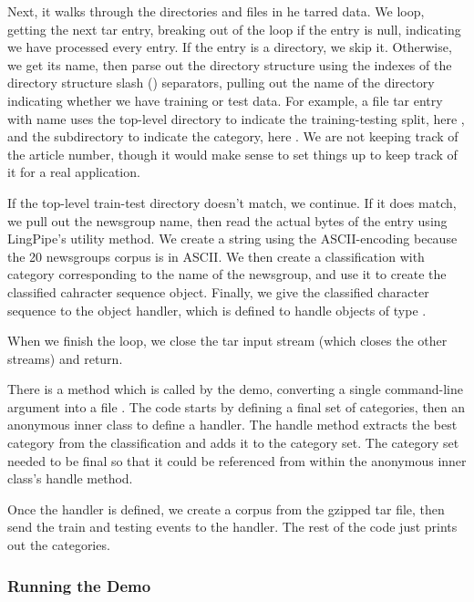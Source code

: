 Next, it walks through the directories and files in he tarred
data.
%
%
We loop, getting the next tar entry, breaking out of the loop if the
entry is null, indicating we have processed every entry.  If the entry
is a directory, we skip it.  Otherwise, we get its name, then parse
out the directory structure using the indexes of the directory
structure slash (\code{/}) separators, pulling out the name of the
directory indicating whether we have training or test data.  For
example, a file tar entry with name
 uses the top-level
directory to indicate the training-testing split, here ,
and the subdirectory to indicate the category, here
.  We are not keeping track of the article number,
though it would make sense to set things up to keep track of it for a
real application.


If the top-level train-test directory doesn't match, we continue.  If
it does match, we pull out the newsgroup name, then read the actual
bytes of the entry using LingPipe's 
utility method.  We create a string using the ASCII-encoding because
the 20 newsgroups corpus is in ASCII.  We then create a classification
with category corresponding to the name of the newsgroup, and use it
to create the classified cahracter sequence object.  Finally, we give
the classified character sequence to the object handler, which is
defined to handle objects of type .

When we finish the loop, we close the tar input stream (which closes
the other streams) and return.

There is a  method which is called by the demo,
converting a single command-line argument into a file
.  The code starts by defining a final set
of categories, then an anonymous inner class to define a handler.
%
%
The handle method extracts the best category from the classification
and adds it to the category set.  The category set needed to be final
so that it could be referenced from within the anonymous inner class's
handle method.

Once the handler is defined, we create a corpus from the gzipped
tar file, then send the train and testing events to the handler.
%
%
The rest of the code just prints out the categories.

\subsubsection{Running the Demo}

